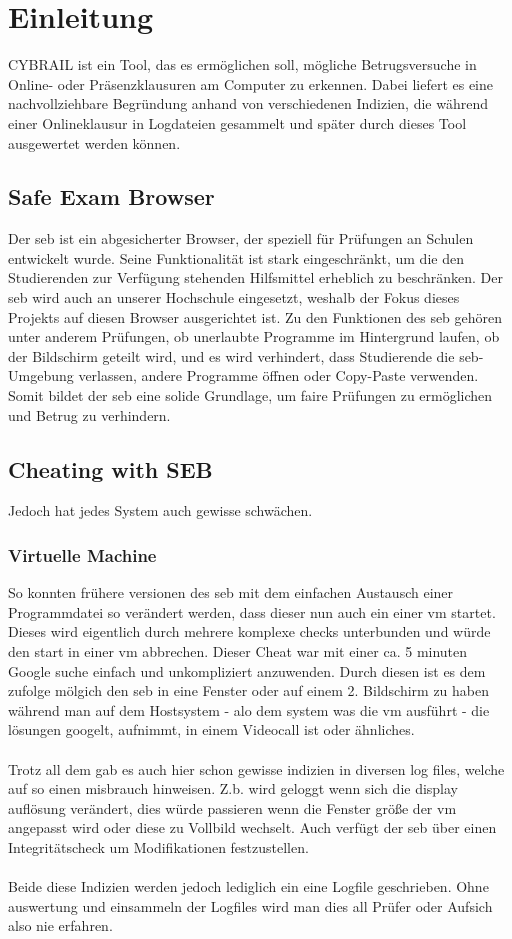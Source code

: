 \chapter{Einleitung} \label{ch:einleitung}
CYBRAIL ist ein Tool, das es ermöglichen soll, mögliche Betrugsversuche in Online- oder Präsenzklausuren am Computer zu erkennen. Dabei liefert es eine nachvollziehbare Begründung anhand von verschiedenen Indizien, die während einer Onlineklausur in Logdateien gesammelt und später durch dieses Tool ausgewertet werden können.

\section{Safe Exam Browser}
Der \gls{seb} ist ein abgesicherter Browser, der speziell für Prüfungen an Schulen entwickelt wurde. Seine Funktionalität ist stark eingeschränkt, um die den Studierenden zur Verfügung stehenden Hilfsmittel erheblich zu beschränken. Der \gls{seb} wird auch an unserer Hochschule eingesetzt, weshalb der Fokus dieses Projekts auf diesen Browser ausgerichtet ist. Zu den Funktionen des \gls{seb} gehören unter anderem Prüfungen, ob unerlaubte Programme im Hintergrund laufen, ob der Bildschirm geteilt wird, und es wird verhindert, dass Studierende die \gls{seb}-Umgebung verlassen, andere Programme öffnen oder Copy-Paste verwenden. Somit bildet der \gls{seb} eine solide Grundlage, um faire Prüfungen zu ermöglichen und Betrug zu verhindern.
\section{Cheating with SEB}
Jedoch hat jedes System auch gewisse schwächen.

\subsection{Virtuelle Machine}
So konnten frühere versionen des \gls{seb} mit dem einfachen Austausch einer Programmdatei so verändert werden, dass dieser nun auch ein einer \gls{vm} startet.
Dieses wird eigentlich durch mehrere komplexe checks unterbunden und würde den start in einer \gls{vm} abbrechen.
Dieser Cheat war mit einer ca. 5 minuten Google suche einfach und unkompliziert anzuwenden.
Durch diesen ist es dem zufolge mölgich den \gls{seb} in eine Fenster oder auf einem 2. Bildschirm zu haben während man auf dem Hostsystem - alo dem system was die \gls{vm} ausführt - die lösungen googelt, aufnimmt, in einem Videocall ist oder ähnliches.\\
\\
Trotz all dem gab es auch hier schon gewisse indizien in diversen log files, welche auf so einen misbrauch hinweisen.
Z.b. wird geloggt wenn sich die display auflösung verändert, dies würde passieren wenn die Fenster größe der \gls{vm} angepasst wird oder diese zu Vollbild wechselt.
Auch verfügt der \gls{seb} über einen Integritätscheck um Modifikationen festzustellen.\\
\\
Beide diese Indizien werden jedoch lediglich ein eine Logfile geschrieben.
Ohne auswertung und einsammeln der Logfiles wird man dies all Prüfer oder Aufsich also nie erfahren.

